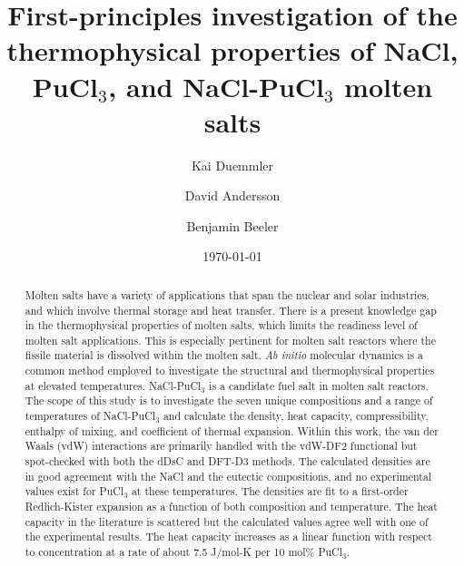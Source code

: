 \documentclass[review]{elsarticle}
\begin{document}
\begin{frontmatter}

\title{First-principles investigation of the thermophysical properties of NaCl, PuCl$_3$, and NaCl-PuCl$_3$ molten salts}

\author[ncsu]{Kai Duemmler}
\author[lanl]{David Andersson}
\author[ncsu,inl]{Benjamin Beeler}

\address[ncsu]{Department of Nuclear Engineering, North Carolina State University, Raleigh, NC 27695}
\address[inl]{Idaho National Laboratory, Idaho Falls, ID 83415}
\address[lanl]{Materials Science and Technology Division, Los Alamos National Laboratory, P.O. Box 1663. Los Alamos, NM, 87545, USA}
\date{\today}

\begin{abstract}
Molten salts have a variety of applications that span the nuclear and solar industries, and which involve thermal storage and heat transfer. There is a present knowledge gap in the thermophysical properties of molten salts, which limits the readiness level of molten salt applications. This is especially pertinent for molten salt reactors where the fissile material is dissolved within the molten salt. \textit{Ab initio} molecular dynamics is a common method employed to investigate the structural and thermophysical properties at elevated temperatures. NaCl-PuCl$_3$ is a candidate fuel salt in molten salt reactors. The scope of this study is to investigate the seven unique compositions and a range of temperatures of NaCl-PuCl$_3$ and calculate the density, heat capacity, compressibility, enthalpy of mixing, and coefficient of thermal expansion. Within this work, the van der Waals (vdW) interactions are primarily handled with the vdW-DF2 functional but spot-checked with both the dDsC and DFT-D3 methods. The calculated densities are in good agreement with the NaCl and the eutectic compositions, and no experimental values exist for PuCl$_3$ at these temperatures. The densities are fit to a first-order Redlich-Kister expansion as a function of both composition and temperature. The heat capacity in the literature is scattered but the calculated values agree well with one of the experimental results. The heat capacity increases as a linear function with respect to concentration at a rate of about 7.5 J/mol-K per 10 mol\% PuCl$_3$.
\end{abstract}

\end{frontmatter}
\end{document}
